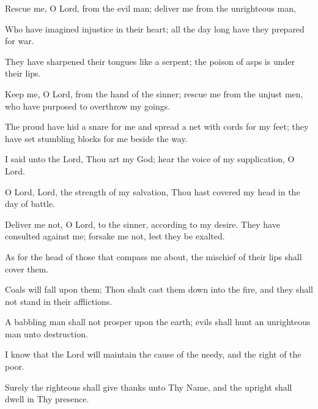 Rescue me, O Lord, from the evil man; deliver me from the unrighteous man,

Who have imagined injustice in their heart; all the day long have they prepared for war.

They have sharpened their tongues like a serpent; the poison of asps is under their lips.

Keep me, O Lord, from the hand of the sinner; rescue me from the unjust men, who have purposed to overthrow my goings.

The proud have hid a snare for me and spread a net with cords for my feet; they have set stumbling blocks for me beside the way.

I said unto the Lord, Thou art my God; hear the voice of my supplication, O Lord.

O Lord, Lord, the strength of my salvation, Thou hast covered my head in the day of battle.

Deliver me not, O Lord, to the sinner, according to my desire. They have consulted against me; forsake me not, lest they be exalted.

As for the head of those that compass me about, the mischief of their lips shall cover them.

Coals will fall upon them; Thou shalt cast them down into the fire, and they shall not stand in their afflictions.

A babbling man shall not prosper upon the earth; evils shall hunt an unrighteous man unto destruction.

I know that the Lord will maintain the cause of the needy, and the right of the poor.

Surely the righteous shall give thanks unto Thy Name, and the upright shall dwell in Thy presence.
